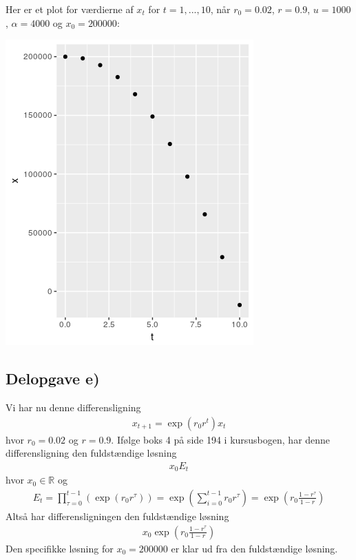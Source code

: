 \documentclass[12pt]{article}
\begin{document}
Her er et plot for værdierne af $x_t$ for $t=1,...,10$, når $r_0=0.02$, $r=0.9$, $u=1000$, $\alpha=4000$ og $x_0=200000$:
\begin{center}
\includegraphics[scale=0.5]{q1p3.png}
\end{center}

\subsection{Delopgave e)}

Vi har nu denne differensligning
\begin{align}
x_{t+1} = \exp(r_0r^t)x_t
\end{align}
hvor $r_0=0.02$ og $r=0.9$. Ifølge boks 4 på side 194 i kursusbogen, har denne differensligning den fuldstændige løsning
\begin{align}
x_0E_t
\end{align}
hvor $x_0\in \mathbb{R}$ og 
\begin{align}
E_t = \prod_{\tau=0}^{t-1}\left( \exp(r_0r^\tau) \right) =  \exp\left(\sum_{i=0}^{t-1}r_0r^\tau\right) = \exp\left(r_0\frac{1-r^\tau}{1-r}\right)
\end{align}
Altså har differensligningen den fuldstændige løsning
\begin{align}
x_0 \exp\left(r_0\frac{1-r^\tau}{1-r}\right)
\end{align}
Den specifikke løsning for $x_0=200000$ er klar ud fra den fuldstændige løsning.
\end{document}
